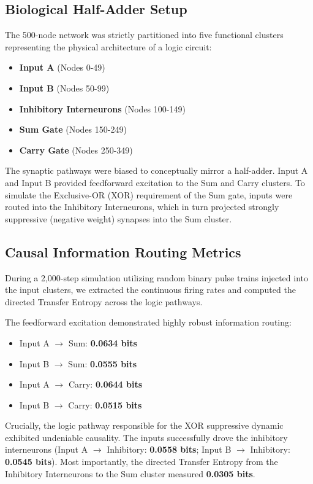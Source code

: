 \documentclass[12pt, a4paper]{article}
\begin{document}
\subsection{Biological Half-Adder Setup}

The 500-node network was strictly partitioned into five functional clusters representing the physical architecture of a logic circuit:
\begin{itemize}
    \item \textbf{Input A} (Nodes 0-49)
    \item \textbf{Input B} (Nodes 50-99)
    \item \textbf{Inhibitory Interneurons} (Nodes 100-149)
    \item \textbf{Sum Gate} (Nodes 150-249)
    \item \textbf{Carry Gate} (Nodes 250-349)
\end{itemize}

The synaptic pathways were biased to conceptually mirror a half-adder. Input A and Input B provided feedforward excitation to the Sum and Carry clusters. To simulate the Exclusive-OR (XOR) requirement of the Sum gate, inputs were routed into the Inhibitory Interneurons, which in turn projected strongly suppressive (negative weight) synapses into the Sum cluster.

\subsection{Causal Information Routing Metrics}

During a 2,000-step simulation utilizing random binary pulse trains injected into the input clusters, we extracted the continuous firing rates and computed the directed Transfer Entropy across the logic pathways.

The feedforward excitation demonstrated highly robust information routing:
\begin{itemize}
    \item Input A $\to$ Sum: \textbf{0.0634 bits}
    \item Input B $\to$ Sum: \textbf{0.0555 bits}
    \item Input A $\to$ Carry: \textbf{0.0644 bits}
    \item Input B $\to$ Carry: \textbf{0.0515 bits}
\end{itemize}

Crucially, the logic pathway responsible for the XOR suppressive dynamic exhibited undeniable causality. The inputs successfully drove the inhibitory interneurons (Input A $\to$ Inhibitory: \textbf{0.0558 bits}; Input B $\to$ Inhibitory: \textbf{0.0545 bits}). Most importantly, the directed Transfer Entropy from the Inhibitory Interneurons to the Sum cluster measured \textbf{0.0305 bits}. 
\end{document}
